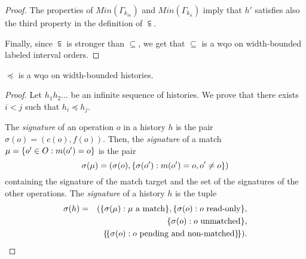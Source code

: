 \begin{proof}
The properties of $Min(\Gamma_{k_m})$ and $Min(\Gamma_{k_n})$ imply that $h'$ satisfies also the third property in the definition of $\subseteqq$.

Finally, since $\subseteqq$ is stronger than $\subseteq$, we get that $\subseteq$ is a wqo on width-bounded labeled interval orders.
\end{proof}

\begin{lemma}

  $\preceq$ is a wqo on width-bounded histories.

\end{lemma}

\begin{proof}

%
%

Let $h_1 h_2\ldots $ be an infinite sequence of histories. We prove that there exists $i<j$ such that $h_i\preceq h_j$.

The \emph{signature} of an operation $o$ in a history $h$ is the pair $\sigma(o)=(c(o),f(o))$.
Then, the \emph{signature} of a match $\mu={\{{ o' \in O : m(o') = o}\}}$ is the pair
\[
\sigma(\mu)=(\sigma(o),{\{{\sigma(o') : m(o')=o, o'\neq o}\}})
\]
containing the signature of the match target and the set of the signatures of the other operations.
The \emph{signature} of a history $h$ is the tuple
\begin{align*}
\sigma(h)&=&({\{{\sigma(\mu): \mu\mbox{ a match}}\}}, {\{{\sigma(o): o\mbox{ read-only}}\}}, \\
&& {\{{\sigma(o): o\mbox{ unmatched}}\}}, \\
&& {\{\!\{ \sigma(o): o\mbox{ pending and non-matched} \}\!\}}).
\end{align*}


\end{proof}
